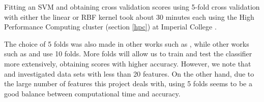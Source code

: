 \documentclass[12pt, twoside, a4paper]{report}
\begin{document}
Fitting an SVM and obtaining cross validation scores using 5-fold cross validation with either the linear or RBF kernel took about 30 minutes each using the High Performance Computing cluster (section \ref{hpc}) at Imperial College \cite{RefWorks:218}.

The choice of 5 folds was also made in other works such as \cite{RefWorks:187}, while other works such as \cite{RefWorks:202} and \cite{RefWorks:212} use 10 folds. More folds will allow us to train and test the classifier more extensively, obtaining scores with higher accuracy. However, we note that \cite{RefWorks:187} and \cite{RefWorks:202} investigated data sets with less than 20 features. On the other hand, due to the large number of features this project deals with, using 5 folds seems to be a good balance between computational time and accuracy.
\end{document}
